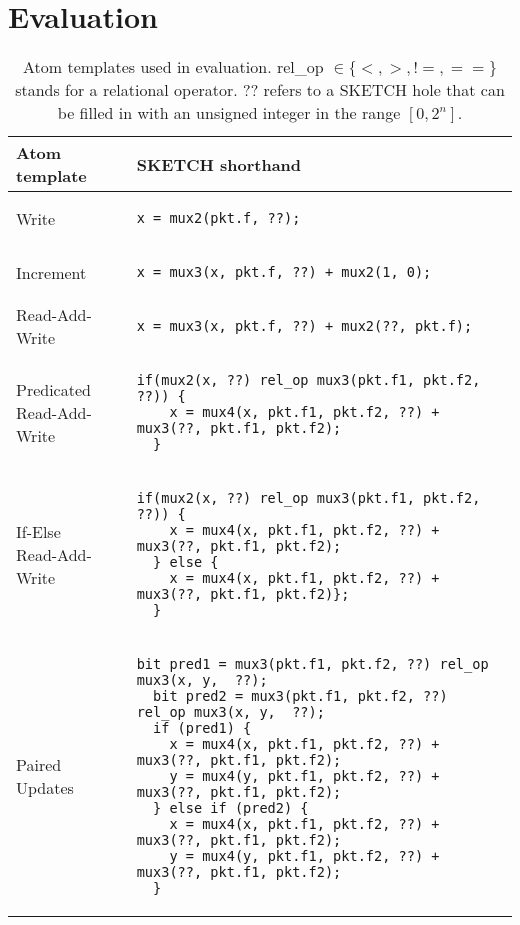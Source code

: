 \section{Evaluation}
\label{s:eval}
\begin{table*}[!t]
  \begin{small}
  \begin{tabular}{|p{}|p{}|}
  \hline
  Atom template & SKETCH shorthand\\
  \hline
  Write &
  {\begin{lstlisting}[style=customc]
  x = mux2(pkt.f, ??);
  \end{lstlisting}} \\
  \hline
  Increment &
  {\begin{lstlisting}[style=customc]
  x = mux3(x, pkt.f, ??) + mux2(1, 0);
  \end{lstlisting}} \\
  \hline
  Read-Add-Write &
  {\begin{lstlisting}[style=customc]
  x = mux3(x, pkt.f, ??) + mux2(??, pkt.f);
  \end{lstlisting}} \\
  \hline
  \pbox{0.15\textwidth}
  {Predicated\\
  Read-Add-Write} &
  {\begin{lstlisting}[style=customc]
  if(mux2(x, ??) rel_op mux3(pkt.f1, pkt.f2, ??)) {
    x = mux4(x, pkt.f1, pkt.f2, ??) + mux3(??, pkt.f1, pkt.f2);
  }
  \end{lstlisting}} \\
  \hline
  \pbox{0.15\textwidth}
  {If-Else\\
   Read-Add-Write} &
  {\begin{lstlisting}[style=customc]
  if(mux2(x, ??) rel_op mux3(pkt.f1, pkt.f2, ??)) {
    x = mux4(x, pkt.f1, pkt.f2, ??) + mux3(??, pkt.f1, pkt.f2);
  } else {
    x = mux4(x, pkt.f1, pkt.f2, ??) + mux3(??, pkt.f1, pkt.f2)};
  }
  \end{lstlisting}} \\
  \hline
  Paired Updates &
  {\begin{lstlisting}[style=customc]
  bit pred1 = mux3(pkt.f1, pkt.f2, ??) rel_op mux3(x, y,  ??);
  bit pred2 = mux3(pkt.f1, pkt.f2, ??) rel_op mux3(x, y,  ??);
  if (pred1) {
    x = mux4(x, pkt.f1, pkt.f2, ??) + mux3(??, pkt.f1, pkt.f2);
    y = mux4(y, pkt.f1, pkt.f2, ??) + mux3(??, pkt.f1, pkt.f2);
  } else if (pred2) {
    x = mux4(x, pkt.f1, pkt.f2, ??) + mux3(??, pkt.f1, pkt.f2);
    y = mux4(y, pkt.f1, pkt.f2, ??) + mux3(??, pkt.f1, pkt.f2);
  }
  \end{lstlisting}} \\
  \hline
  \end{tabular}
\end{small}
  \caption{Atom templates used in evaluation. rel\_op $\in \{<, >, != , ==\}$ stands for a relational operator. ?? refers to a SKETCH hole that can be filled in with an unsigned integer in the range $[0, 2^n]$.}
  \label{tab:templates}
\end{table*}


